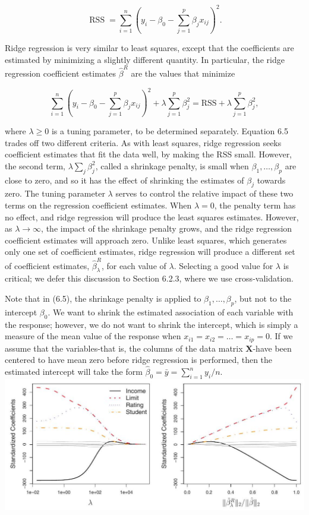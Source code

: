 \documentclass[10pt]{article}
\begin{document}
$$
\operatorname{RSS}=\sum_{i=1}^{n}\left(y_{i}-\beta_{0}-\sum_{j=1}^{p} \beta_{j} x_{i j}\right)^{2} .
$$

Ridge regression is very similar to least squares, except that the coefficients are estimated by minimizing a slightly different quantity. In particular, the ridge regression coefficient estimates $\hat{\beta}^{R}$ are the values that minimize


\begin{equation*}
\sum_{i=1}^{n}\left(y_{i}-\beta_{0}-\sum_{j=1}^{p} \beta_{j} x_{i j}\right)^{2}+\lambda \sum_{j=1}^{p} \beta_{j}^{2}=\mathrm{RSS}+\lambda \sum_{j=1}^{p} \beta_{j}^{2}, \tag{6.5}
\end{equation*}


where $\lambda \geq 0$ is a tuning parameter, to be determined separately. Equation 6.5 trades off two different criteria. As with least squares, ridge regression seeks coefficient estimates that fit the data well, by making the RSS small. However, the second term, $\lambda \sum_{j} \beta_{j}^{2}$, called a shrinkage penalty, is small when $\beta_{1}, \ldots, \beta_{p}$ are close to zero, and so it has the effect of shrinking the estimates of $\beta_{j}$ towards zero. The tuning parameter $\lambda$ serves to control the relative impact of these two terms on the regression coefficient estimates. When $\lambda=0$, the penalty term has no effect, and ridge regression will produce the least squares estimates. However, as $\lambda \rightarrow \infty$, the impact of the shrinkage penalty grows, and the ridge regression coefficient estimates will approach zero. Unlike least squares, which generates only one set of coefficient estimates, ridge regression will produce a different set of coefficient estimates, $\hat{\beta}_{\lambda}^{R}$, for each value of $\lambda$. Selecting a good value for $\lambda$ is critical; we defer this discussion to Section 6.2.3, where we use cross-validation.

Note that in (6.5), the shrinkage penalty is applied to $\beta_{1}, \ldots, \beta_{p}$, but not to the intercept $\beta_{0}$. We want to shrink the estimated association of each variable with the response; however, we do not want to shrink the intercept, which is simply a measure of the mean value of the response when $x_{i 1}=x_{i 2}=\ldots=x_{i p}=0$. If we assume that the variables-that is, the columns of the data matrix $\mathbf{X}$-have been centered to have mean zero before ridge regression is performed, then the estimated intercept will take the form $\hat{\beta}_{0}=\bar{y}=\sum_{i=1}^{n} y_{i} / n$.\\
\includegraphics[max width=\textwidth, center]{2025_05_05_efe77898333945044de4g-231}
\end{document}
